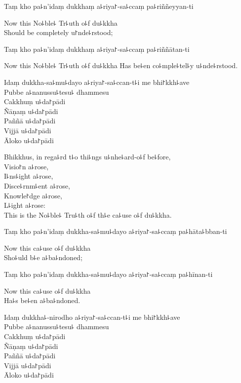 Taṃ kho pa꜕n'idaṃ dukkhaṃ a꜕riya꜓-sa꜕ccaṃ pa꜕riññeyyan-ti

\begin{english}
  Now this No꜕ble꜕ Tr꜕uth o꜕f du꜕kkha\\
  Should be completely u꜓nde꜕rstood;
\end{english}

Taṃ kho pa꜕n'idaṃ dukkhaṃ a꜕riya꜓-sa꜕ccaṃ pa꜕riññātan-ti

\begin{english}
  Now this No꜕ble꜕ Tr꜕uth o꜕f du꜕kkha
  Has be꜕en co꜕mple꜕tel꜕y u꜕nde꜕rstood.
\end{english}

Idaṃ dukkha-sa꜕mu꜕dayo a꜕riya꜓-sa꜕ccan-t꜕i me bhi꜓kkh꜕ave\\
Pubbe a꜕nanussu꜕tesu꜕ dhammesu\\
Cakkhuṃ u꜕da꜓pādi\\
Ñāṇaṃ u꜕da꜓pādi\\
Paññā u꜕da꜓pādi\\
Vijjā u꜕da꜓pādi\\
Āloko u꜕da꜓pādi

\begin{english}
  Bhikkhus, in rega꜕rd t꜕o thi꜕ngs u꜕nhe꜕ard-o꜕f be꜕fore,\\
  Visio꜓n a꜕rose,\\
  I꜕ns꜕ight a꜕rose,\\
  Disce꜕rnm꜕ent a꜕rose,\\
  Knowle꜓dge a꜕rose,\\
  L꜕ight a꜕rose:\\
  This is the No꜕ble꜕ Tru꜕th o꜕f th꜕e ca꜕use o꜕f du꜕kkha.
\end{english}

Taṃ kho pa꜕n'idaṃ dukkha-sa꜕mu꜕dayo a꜕riya꜓-sa꜕ccaṃ pa꜕hāta꜕bban-ti

\begin{english}
  Now this ca꜕use o꜕f du꜕kkha\\
  Sho꜕uld b꜕e a꜕ba꜕ndoned;
\end{english}

Taṃ kho pa꜕n'idaṃ dukkha-sa꜕mu꜕dayo a꜕riya꜓-sa꜕ccaṃ pa꜕hīnan-ti

\begin{english}
  Now this ca꜕use o꜕f du꜕kkha\\
  Ha꜕s be꜕en a꜕ba꜕ndoned.
\end{english}

Idaṃ dukkha꜕-nirodho a꜕riya꜓-sa꜕ccan-t꜕i me bhi꜓kkh꜕ave\\
Pubbe a꜕nanussu꜕tesu꜕ dhammesu\\
Cakkhuṃ u꜕da꜓pādi\\
Ñāṇaṃ u꜕da꜓pādi\\
Paññā u꜕da꜓pādi\\
Vijjā u꜕da꜓pādi\\
Āloko u꜕da꜓pādi

